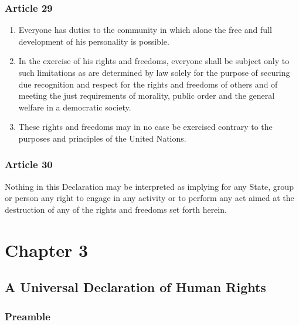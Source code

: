 \documentclass[
  titlepage,
  openright,
  DIV=calc,
  toc=listof,
  listof=nochaptergap]{scrbook}
\begin{document}
\hypertarget{article-29-1}{%
\subsection{Article 29}\label{article-29-1}}

\begin{enumerate}
\def\labelenumi{\arabic{enumi}.}
\item
  Everyone has duties to the community in which alone the free and full
  development of his personality is possible.
\item
  In the exercise of his rights and freedoms, everyone shall be subject
  only to such limitations as are determined by law solely for the
  purpose of securing due recognition and respect for the rights and
  freedoms of others and of meeting the just requirements of morality,
  public order and the general welfare in a democratic society.
\item
  These rights and freedoms may in no case be exercised contrary to the
  purposes and principles of the United Nations.
\end{enumerate}

\hypertarget{article-30-1}{%
\subsection{Article 30}\label{article-30-1}}

Nothing in this Declaration may be interpreted as implying for any
State, group or person any right to engage in any activity or to perform
any act aimed at the destruction of any of the rights and freedoms set
forth herein.

\hypertarget{sec:chapter3}{%
\chapter{Chapter 3}\label{sec:chapter3}}

\hypertarget{a-universal-declaration-of-human-rights-2}{%
\section{A Universal Declaration of Human
Rights}\label{a-universal-declaration-of-human-rights-2}}

\hypertarget{preamble-2}{%
\subsection{Preamble}\label{preamble-2}}
\end{document}
